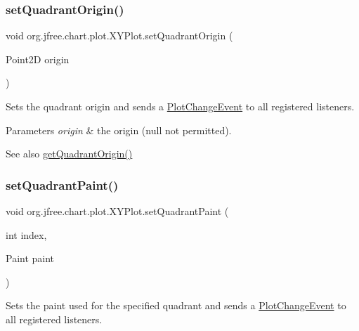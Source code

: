 \subsubsection{\texorpdfstring{set\+Quadrant\+Origin()}{setQuadrantOrigin()}}
{\footnotesize\ttfamily void org.\+jfree.\+chart.\+plot.\+X\+Y\+Plot.\+set\+Quadrant\+Origin (\begin{DoxyParamCaption}\item[{Point2D}]{origin }\end{DoxyParamCaption})}

Sets the quadrant origin and sends a \mbox{\hyperlink{}{Plot\+Change\+Event}} to all registered listeners.


\begin{DoxyParams}{Parameters}
{\em origin} & the origin ({\ttfamily null} not permitted).\\
\hline
\end{DoxyParams}
\begin{DoxySeeAlso}{See also}
\mbox{\hyperlink{classorg_1_1jfree_1_1chart_1_1plot_1_1_x_y_plot_a618e05d8ad1e56930231dd6a4de3661c}{get\+Quadrant\+Origin()}} 
\end{DoxySeeAlso}
\mbox{\label{classorg_1_1jfree_1_1chart_1_1plot_1_1_x_y_plot_a52c03f4be6805639d5597eb247fcd249}} 
\subsubsection{\texorpdfstring{set\+Quadrant\+Paint()}{setQuadrantPaint()}}
{\footnotesize\ttfamily void org.\+jfree.\+chart.\+plot.\+X\+Y\+Plot.\+set\+Quadrant\+Paint (\begin{DoxyParamCaption}\item[{int}]{index,  }\item[{Paint}]{paint }\end{DoxyParamCaption})}

Sets the paint used for the specified quadrant and sends a \mbox{\hyperlink{}{Plot\+Change\+Event}} to all registered listeners.


